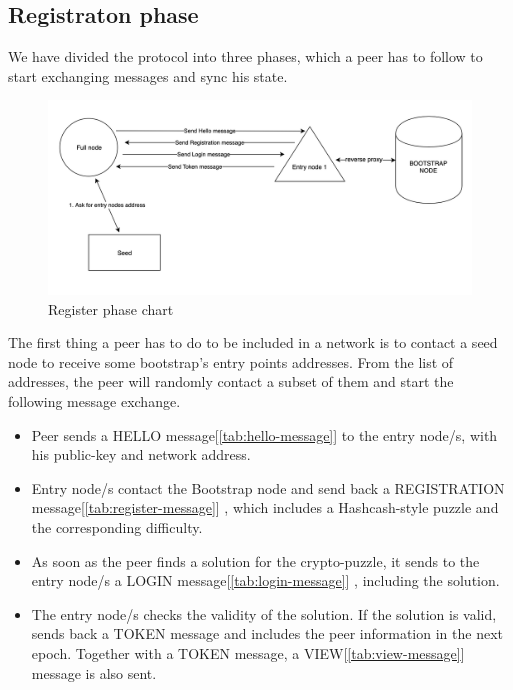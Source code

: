 \documentclass[mscthesis]{usiinfthesis}
\begin{document}
\subsection{Registraton phase}
We have divided the protocol into three phases, which a peer has to follow to start exchanging messages and sync his state. 

\begin{figure}[h]
  \includegraphics[width=\linewidth]{images/register-phase.png}
  \caption{Register phase chart}
  \label{fig:register-phase}
\end{figure}

The first thing a peer has to do to be included in a network is to contact a seed node to receive some bootstrap's entry points addresses. From the list of addresses, the peer will randomly contact a subset of them and start the following message exchange.
\begin{itemize}
	\item Peer sends a HELLO message[\ref{tab:hello-message}] to the entry node/s, with his public-key and network address.
	\item Entry node/s contact the Bootstrap node and send back a REGISTRATION message[\ref{tab:register-message}] , which includes a Hashcash-style puzzle and the corresponding difficulty.
	\item As soon as the peer finds a solution for the crypto-puzzle, it sends to the entry node/s a LOGIN message[\ref{tab:login-message}] , including the solution.
	\item The entry node/s checks the validity of the solution. If the solution is valid, sends back a TOKEN message and includes the peer information in the next epoch. Together with a TOKEN message, a VIEW[\ref{tab:view-message}] message is also sent.
\end{itemize}
  
\end{document}
